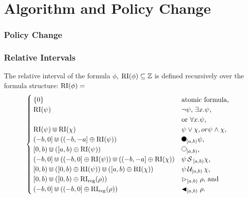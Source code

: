 \section{Algorithm and Policy Change}

\begin{frame}
    \frametitle{Policy Change}
    
\end{frame}

\begin{frame}
    \frametitle{Relative Intervals}
    \begin{definition} 
        \label{def:rel-int}
        The relative interval of the formula $\phi$, $\operatorname{RI}(\phi) \subseteq \mathbb{Z}$ is defined recursively over the formula structure: 
        $\operatorname{RI}(\phi) =$
        \begin{equation*}
            \begin{cases}
                \{0\}     & \text{atomic formula,} \\ 
                \RI(\psi) & \text{$\neg \psi$, 
                                    $\exists x.\psi$,} \\ &\text{or $\forall x.\psi$,} \\
                \RI(\psi) \Cup \RI(\chi) & \text{$\psi \lor \chi, or
                                                \psi \land \chi$,} \\
                (-b,0] \Cup ((-b,-a] \oplus \RI(\psi)) & \text{$\Previous{[a,b)}\psi$,} \\
                [0,b) \Cup ([a,b) \oplus \RI(\psi)) & \text{$\Next{[a,b)}$,}\\
                (-b,0] \Cup ((-b,0] \oplus \RI(\psi)) \Cup ((-b,-a] \oplus \RI(\chi)) & \text{$\psi \Since{}_{[a,b)} \chi$,} \\
                [0,b) \Cup ([0,b) \oplus \RI(\psi)) \Cup ([a,b) \oplus \RI(\chi)) & \text{$\psi \Until{[a,b)} \chi$,} \\
                [0,b) \Cup ([0,b) \oplus \RIr(\rho)) & \text{$\Fregex{[a,b)} \rho$, and}\\
                (-b,0] \Cup ((-b,0] \oplus \RIr(\rho)) & \text{$\Pregex{[a,b)} \rho$.}\\
            \end{cases}
        \end{equation*}
    \end{definition}
\end{frame}

